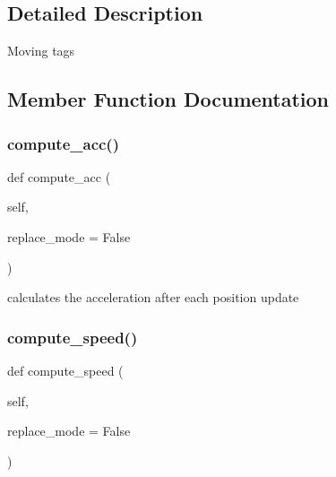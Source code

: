 \subsection{Detailed Description}
\begin{DoxyVerb}Moving tags\end{DoxyVerb}
 

\subsection{Member Function Documentation}
\mbox{\label{classmovingentity_1_1_moving_entity_a799b068567d0358b6bc0f6ec2cbdeb02}} 
\subsubsection{\texorpdfstring{compute\+\_\+acc()}{compute\_acc()}}
{\footnotesize\ttfamily def compute\+\_\+acc (\begin{DoxyParamCaption}\item[{}]{self,  }\item[{}]{replace\+\_\+mode = {\ttfamily False} }\end{DoxyParamCaption})}

\begin{DoxyVerb}calculates the acceleration after each position update\end{DoxyVerb}
 \mbox{\label{classmovingentity_1_1_moving_entity_a547093d75e0e1ade6c2df927e0907bd6}} 
\subsubsection{\texorpdfstring{compute\+\_\+speed()}{compute\_speed()}}
{\footnotesize\ttfamily def compute\+\_\+speed (\begin{DoxyParamCaption}\item[{}]{self,  }\item[{}]{replace\+\_\+mode = {\ttfamily False} }\end{DoxyParamCaption})}

